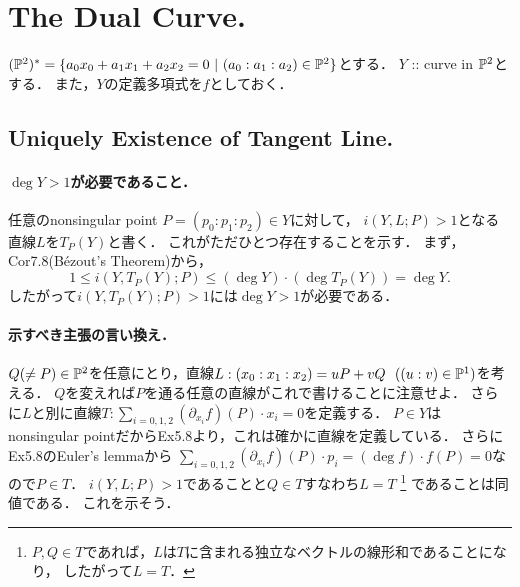 \documentclass[a4paper]{jsarticle}
\begin{document}
\section{The Dual Curve.} %
    $(\mathbb{P}^2)^*=\{ a_0 x_0+a_1 x_1+a_2 x_2=0 ~|~ (a_0:a_1:a_2) \in \mathbb{P}^2 \}$とする．
    $Y$ :: curve in $\mathbb{P}^2$とする．
    また，$Y$の定義多項式を$f$としておく．

    \subsection{Uniquely Existence of Tangent Line.}
    \paragraph{$\deg Y>1$が必要であること．}
    任意のnonsingular point $P=(p_0:p_1:p_2) \in Y$に対して，
    $i(Y, L; P)>1$となる直線$L$を$T_P(Y)$と書く．
    これがただひとつ存在することを示す．
    まず，Cor7.8(B\'ezout's Theorem)から，
    \[ 1 \leq i(Y, T_P(Y); P) \leq (\deg Y) \cdot (\deg T_P(Y))=\deg Y. \]
    したがって$i(Y, T_P(Y); P)>1$には$\deg Y>1$が必要である．

    \paragraph{示すべき主張の言い換え．}
    $Q (\neq P) \in \mathbb{P}^2$を任意にとり，直線$L: (x_0:x_1:x_2)=uP+vQ ~~((u:v) \in \mathbb{P}^1)$を考える．
    $Q$を変えれば$P$を通る任意の直線がこれで書けることに注意せよ．
    さらに$L$と別に直線$T: \sum_{i=0,1,2}(\partial_{x_i} f)(P) \cdot x_i=0$を定義する．
    $P \in Y$はnonsingular pointだからEx5.8より，これは確かに直線を定義している．
    さらにEx5.8のEuler's lemmaから
    $\sum_{i=0,1,2}(\partial_{x_i} f)(P) \cdot p_i=(\deg f) \cdot f(P)=0$なので$P \in T$．
    $i(Y,L; P)>1$であることと$Q \in T$すなわち$L=T$
    \footnote
    {
        $P, Q \in T$であれば，$L$は$T$に含まれる独立なベクトルの線形和であることになり，
        したがって$L=T$．
    }
    であることは同値である．
    これを示そう．
\end{document}
